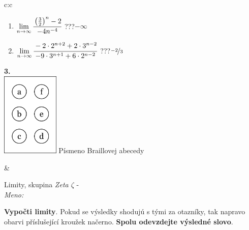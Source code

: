 \documentclass[10pt]{report}
\begin{document}
\begin{tabular}{c:c}
\begin{minipage}[c][104.5mm][t]{0.5\linewidth}
\begin{center}
\begin{minipage}{0.79\linewidth}
\begin{center}
\begin{varwidth}{\linewidth}
\begin{enumerate}
\item $\lim\limits_{n\to\infty}\cfrac{\left(\frac{3}{2}\right)^n -2}{-4n^{-4}}$\quad \dotfill\; ???\;\dotfill \quad $-\infty$
\item $\lim\limits_{n\to\infty}\cfrac{-2\cdot 2^{n+2}+2\cdot 3^{n-2}}{-9\cdot 3^{n+1}+6\cdot 2^{n-2}}$\quad \dotfill\; ???\;\dotfill \quad $\nicefrac{-2}{3}$
\end{enumerate}
\end{varwidth}
\end{center}
\end{minipage}
\begin{minipage}{0.20\linewidth}
\begin{center}
{\Huge\bfseries 3.} \\[2mm]
\includegraphics[height=40mm]{../images/braille.png}
{\small Písmeno Braillovej abecedy}
\end{center}
\end{minipage}
\end{center}
\end{minipage}
&
\begin{minipage}[c][104.5mm][t]{0.5\linewidth}
\begin{center}
\vspace{7mm}
{\huge Limity, skupina \textit{Zeta $\zeta$} -}\\[5mm]
\textit{Meno:}\phantom{xxxxxxxxxxxxxxxxxxxxxxxxxxxxxxxxxxxxxxxxxxxxxxxxxxxxxxxxxxxxxxxxx}\\[5mm]
\begin{minipage}{0.95\linewidth}
\begin{center}
\textbf{Vypočti limity}. Pokud se výsledky shodujú s tými za otazníky, tak napravo\\obarvi příslušející kroužek načerno. \textbf{Spolu odevzdejte výsledné slovo}.
\end{center}
\end{minipage}
\\[1mm]
\begin{minipage}{0.79\linewidth}
\begin{center}
\begin{varwidth}{\linewidth}

\end{varwidth}
\end{center}
\end{minipage}
\end{center}
\end{minipage}
\end{tabular}
\end{document}
